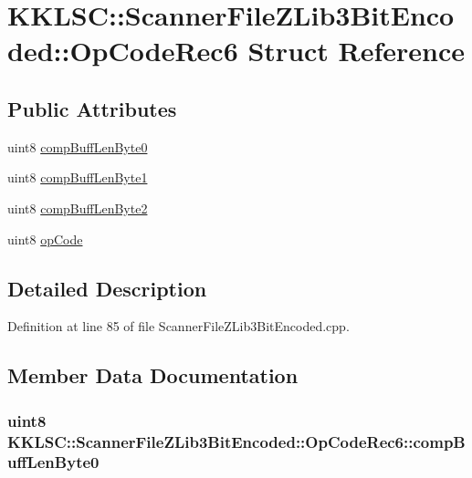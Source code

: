 \hypertarget{struct_scanner_file_z_lib3_bit_encoded_1_1_op_code_rec6}{}\section{K\+K\+L\+SC\+:\+:Scanner\+File\+Z\+Lib3\+Bit\+Encoded\+:\+:Op\+Code\+Rec6 Struct Reference}
\label{struct_scanner_file_z_lib3_bit_encoded_1_1_op_code_rec6}
\subsection*{Public Attributes}
\begin{DoxyCompactItemize}
\item 
uint8 \hyperlink{struct_scanner_file_z_lib3_bit_encoded_1_1_op_code_rec6_a1c926c1df9e2795ea5986b26ed45ab16}{comp\+Buff\+Len\+Byte0}
\item 
uint8 \hyperlink{struct_scanner_file_z_lib3_bit_encoded_1_1_op_code_rec6_a27364e9c74664136b2786946e5b6c88d}{comp\+Buff\+Len\+Byte1}
\item 
uint8 \hyperlink{struct_scanner_file_z_lib3_bit_encoded_1_1_op_code_rec6_a8c6b43ae78f94c9c3399dffbb0e34ccb}{comp\+Buff\+Len\+Byte2}
\item 
uint8 \hyperlink{struct_scanner_file_z_lib3_bit_encoded_1_1_op_code_rec6_aacd07a55958431eb636e8fd271259e44}{op\+Code}
\end{DoxyCompactItemize}


\subsection{Detailed Description}


Definition at line 85 of file Scanner\+File\+Z\+Lib3\+Bit\+Encoded.\+cpp.



\subsection{Member Data Documentation}
\subsubsection[{\texorpdfstring{comp\+Buff\+Len\+Byte0}{compBuffLenByte0}}]{\setlength{\rightskip}{0pt plus 5cm}uint8 K\+K\+L\+S\+C\+::\+Scanner\+File\+Z\+Lib3\+Bit\+Encoded\+::\+Op\+Code\+Rec6\+::comp\+Buff\+Len\+Byte0}\hypertarget{struct_scanner_file_z_lib3_bit_encoded_1_1_op_code_rec6_a1c926c1df9e2795ea5986b26ed45ab16}{}\label{struct_scanner_file_z_lib3_bit_encoded_1_1_op_code_rec6_a1c926c1df9e2795ea5986b26ed45ab16}



